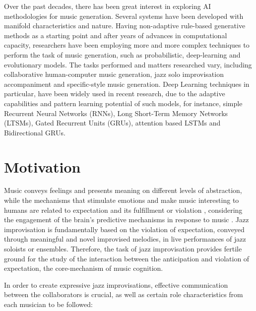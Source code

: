     Over the past decades, there has been great interest in exploring AI methodologies for music generation. Several systems have been developed with manifold characteristics and nature. Having non-adaptive rule-based generative methods as a starting point and after years of advances in computational capacity, researchers have been employing more and more complex techniques to perform the task of music generation, such as probabilistic, deep-learning and evolutionary models. The tasks performed and matters researched vary, including collaborative human-computer music generation, jazz solo improvisation accompaniment and specific-style music generation. Deep Learning techniques in particular, have been widely used in recent research, due to the adaptive capabilities and pattern learning potential of such models, for instance, simple Recurrent Neural Networks (RNNs), Long Short-Term Memory Networks (LTSMs), Gated Recurrent Units (GRUs), attention based LSTMs and Bidirectional GRUs.


    \section{Motivation} \label{sec:motivation}
    Music conveys feelings and presents meaning on different levels of abstraction, while the mechanisms that stimulate emotions and make music interesting to humans are related to expectation and its fulfillment or violation \cite{huron2006sweet}, considering the engagement of the brain's predictive mechanisms in response to music \cite{margulis2007surprise}. Jazz improvisation is fundamentally based on the violation of expectation, conveyed through meaningful and novel improvised melodies, in live performances of jazz soloists or ensembles. Therefore, the task of jazz improvisation provides fertile ground for the study of the interaction between the anticipation and violation of expectation, the core-mechanism of music cognition.

    In order to create expressive jazz improvisations, effective communication between the collaborators is crucial, as well as certain role characteristics from each musician to be followed: 
    
